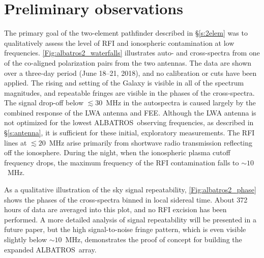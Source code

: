 \documentclass{ws-jai}
\def\albatros{ALBATROS}
\begin{document}
\section{Preliminary observations}\label{s:obs}

The primary goal of the two-element pathfinder described in
\S\ref{s:2elem} was to qualitatively assess the level of RFI and
ionospheric contamination at low frequencies.
\autoref{Fig:albatros2_waterfalls} illustrates auto- and cross-spectra
from one of the co-aligned polarization pairs from the two antennas.
The data are shown over a three-day period (June 18--21, 2018), and no
calibration or cuts have been applied.  The rising and setting of the
Galaxy is visible in all of the spectrum magnitudes, and repeatable
fringes are visible in the phases of the cross-spectra.  The signal
drop-off below $\lesssim30$~MHz in the autospectra is caused largely
by the combined response of the LWA antenna and FEE.  Although the LWA
antenna is not optimized for the lowest \albatros\ observing
frequencies, as described in \S\ref{s:antenna}, it is sufficient for
these initial, exploratory measurements.  The RFI lines at
$\lesssim20$~MHz arise primarily from shortwave radio transmission
reflecting off the ionosphere.  During the night, when the ionospheric
plasma cutoff frequency drops, the maximum frequency of the RFI
contamination falls to $\sim10$~MHz.

As a qualitative illustration of the sky signal repeatability,
\autoref{Fig:albatros2_phase} shows the phases of the cross-spectra
binned in local sidereal time.  About 372 hours of data are averaged
into this plot, and no RFI excision has been performed.  A more
detailed analysis of signal repeatability will be presented in a
future paper, but the high signal-to-noise fringe pattern, which is
even visible slightly below $\sim10$~MHz, demonstrates the proof of
concept for building the expanded \albatros\ array.

\end{document}
